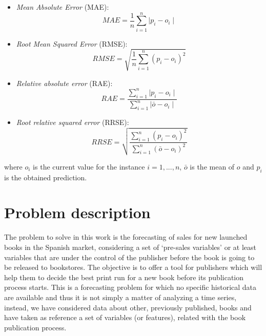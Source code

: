 \documentclass[a4paper,10pt,twocolumn,preprint,3p]{elsarticle}
\begin{document}
\begin{itemize}
  \item \emph{Mean Absolute Error} (MAE):
        \begin{equation}\label{eq:MAE}
            MAE = \frac{1}{n}\sum_{i=1}^n {\mid p_i - o_i\mid}
        \end{equation}

  \item \emph{Root Mean Squared Error} (RMSE):
        \begin{equation}\label{eq:RMSE}
            RMSE = \sqrt{ \frac{1}{n}\sum_{i=1}^n {(p_i - o_i)}^2 }
        \end{equation}

  \item \emph{Relative absolute error} (RAE):
        \begin{equation}\label{eq:RAE}
            RAE = \frac{ \sum_{i=1}^n {\mid p_i - o_i\mid} }{ \sum_{i=1}^n {\mid \bar{o} - o_i\mid} }
        \end{equation}

  \item \emph{Root relative squared error} (RRSE):
        \begin{equation}\label{eq:RRSE}
            RRSE = \sqrt{ \frac{ \sum_{i=1}^n {(p_i - o_i)}^2  }{ \sum_{i=1}^n {(\bar{o} - o_i)}^2 }  }
        \end{equation}
\end{itemize}
where $o_i$ is the current value for the instance $i = {1,...,n}$, $\bar{o}$ is the mean of $o$ and $p_i$ is the obtained prediction.



\section{Problem description}
\label{sec:problem}

The problem to solve in this work is the forecasting of sales for new
launched books in the Spanish market, considering a set of `pre-sales
variables' or at least variables that are under the control of the
publisher before the book is going to be released to bookstores. The
objective is to offer a tool for publishers which will help them to
decide the best print run for a new book before its publication
process starts. This is a forecasting problem for which no specific
historical data are available and thus it is not simply a matter of
analyzing a time series, instead, we have considered data about other,
previously published, books and have taken as reference a set of
variables (or features), 
related with the book publication process. 
\end{document}
